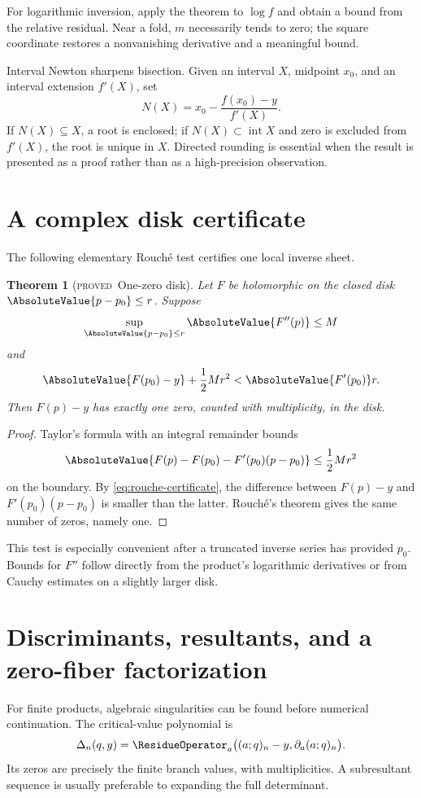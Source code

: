 \documentclass[11pt,letterpaper,oneside,openany]{book}
\newtheorem{theorem}{Theorem}[chapter]
\theoremstyle{definition}
\theoremstyle{remark}
\newcommand{\statusproved}{\textcolor{provedgreen}{\textsc{proved}}}
\begin{document}
For logarithmic inversion, apply the theorem to \(\log f\) and obtain a bound
from the relative residual.  Near a fold, \(m\) necessarily tends to zero; the
square coordinate restores a nonvanishing derivative and a meaningful bound.

Interval Newton sharpens bisection.  Given an interval \(X\), midpoint \(x_0\),
and an interval extension \(f'(X)\), set
\[
 N(X)=x_0-\frac{f(x_0)-y}{f'(X)}.
\]
If \(N(X)\subseteq X\), a root is enclosed; if
\(N(X)\subset\operatorname{int}X\) and zero is excluded from \(f'(X)\), the
root is unique in \(X\).  Directed rounding is essential when the result is
presented as a proof rather than as a high-precision observation.

\section{A complex disk certificate}
The following elementary Rouch\'e test certifies one local inverse sheet.

\begin{theorem}[\statusproved\ One-zero disk]\label{thm:one-zero-disk}
Let \(F\) be holomorphic on the closed disk
\(\AbsoluteValue{p-p_0}\le r\).  Suppose
\[
 \sup_{\AbsoluteValue{p-p_0}\le r}\AbsoluteValue{F''(p)}\le M
\]
and
\begin{equation}\label{eq:rouche-certificate}
 \AbsoluteValue{F(p_0)-y}+\frac12Mr^2<\AbsoluteValue{F'(p_0)}r.
\end{equation}
Then \(F(p)-y\) has exactly one zero, counted with multiplicity, in the disk.
\end{theorem}
\begin{proof}
Taylor's formula with an integral remainder bounds
\[
 \AbsoluteValue{F(p)-F(p_0)-F'(p_0)(p-p_0)}\le\frac12Mr^2
\]
on the boundary.  By \eqref{eq:rouche-certificate}, the difference between
\(F(p)-y\) and \(F'(p_0)(p-p_0)\) is smaller than the latter.  Rouch\'e's
theorem gives the same number of zeros, namely one.
\end{proof}

This test is especially convenient after a truncated inverse series has
provided \(p_0\).  Bounds for \(F''\) follow directly from the product's
logarithmic derivatives or from Cauchy estimates on a slightly larger disk.

\section{Discriminants, resultants, and a zero-fiber factorization}
For finite products, algebraic singularities can be found before numerical
continuation.  The critical-value polynomial is
\[
 \Delta_n(q,y)=
 \ResidueOperator_a\bigl((a;q)_n-y,\partial_a(a;q)_n\bigr).
\]
Its zeros are precisely the finite branch values, with multiplicities.  A
subresultant sequence is usually preferable to expanding the full determinant.
\end{document}
